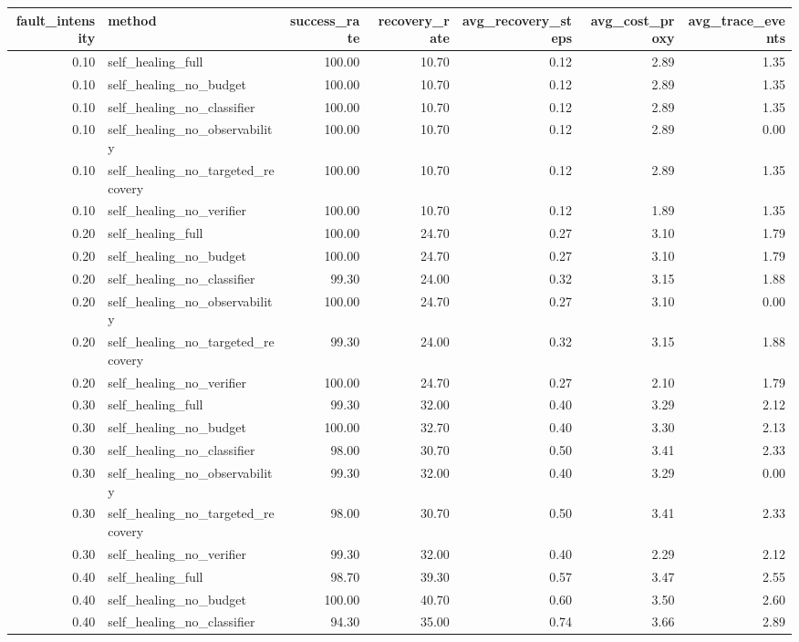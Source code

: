 \begin{tabular}{rlrrrrr}
\toprule
fault_intensity & method & success_rate & recovery_rate & avg_recovery_steps & avg_cost_proxy & avg_trace_events \\
\midrule
0.10 & self_healing_full & 100.00 & 10.70 & 0.12 & 2.89 & 1.35 \\
0.10 & self_healing_no_budget & 100.00 & 10.70 & 0.12 & 2.89 & 1.35 \\
0.10 & self_healing_no_classifier & 100.00 & 10.70 & 0.12 & 2.89 & 1.35 \\
0.10 & self_healing_no_observability & 100.00 & 10.70 & 0.12 & 2.89 & 0.00 \\
0.10 & self_healing_no_targeted_recovery & 100.00 & 10.70 & 0.12 & 2.89 & 1.35 \\
0.10 & self_healing_no_verifier & 100.00 & 10.70 & 0.12 & 1.89 & 1.35 \\
0.20 & self_healing_full & 100.00 & 24.70 & 0.27 & 3.10 & 1.79 \\
0.20 & self_healing_no_budget & 100.00 & 24.70 & 0.27 & 3.10 & 1.79 \\
0.20 & self_healing_no_classifier & 99.30 & 24.00 & 0.32 & 3.15 & 1.88 \\
0.20 & self_healing_no_observability & 100.00 & 24.70 & 0.27 & 3.10 & 0.00 \\
0.20 & self_healing_no_targeted_recovery & 99.30 & 24.00 & 0.32 & 3.15 & 1.88 \\
0.20 & self_healing_no_verifier & 100.00 & 24.70 & 0.27 & 2.10 & 1.79 \\
0.30 & self_healing_full & 99.30 & 32.00 & 0.40 & 3.29 & 2.12 \\
0.30 & self_healing_no_budget & 100.00 & 32.70 & 0.40 & 3.30 & 2.13 \\
0.30 & self_healing_no_classifier & 98.00 & 30.70 & 0.50 & 3.41 & 2.33 \\
0.30 & self_healing_no_observability & 99.30 & 32.00 & 0.40 & 3.29 & 0.00 \\
0.30 & self_healing_no_targeted_recovery & 98.00 & 30.70 & 0.50 & 3.41 & 2.33 \\
0.30 & self_healing_no_verifier & 99.30 & 32.00 & 0.40 & 2.29 & 2.12 \\
0.40 & self_healing_full & 98.70 & 39.30 & 0.57 & 3.47 & 2.55 \\
0.40 & self_healing_no_budget & 100.00 & 40.70 & 0.60 & 3.50 & 2.60 \\
0.40 & self_healing_no_classifier & 94.30 & 35.00 & 0.74 & 3.66 & 2.89 \\

\end{tabular}

